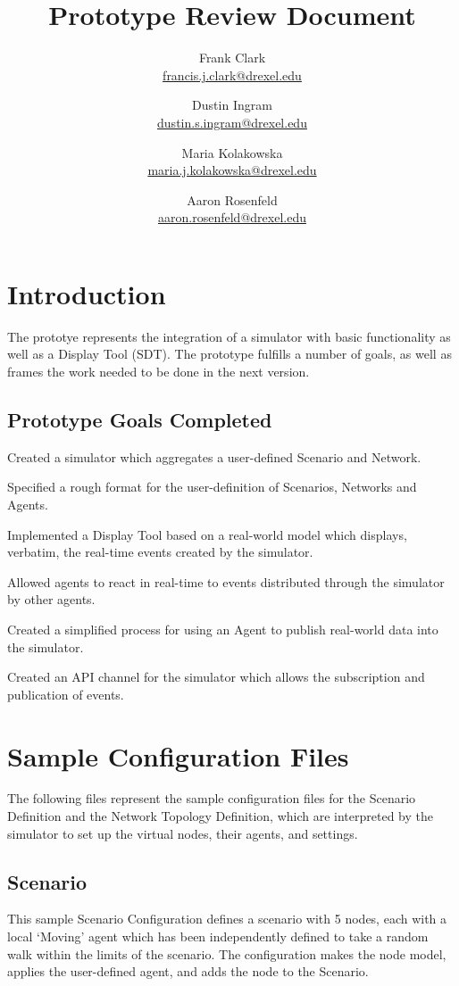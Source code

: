 \documentclass{article}
\title{Prototype Review Document}
\author{
	Frank Clark \\\url{francis.j.clark@drexel.edu}
    \and Dustin Ingram \\\url{dustin.s.ingram@drexel.edu}
	\and Maria Kolakowska \\\url{maria.j.kolakowska@drexel.edu}
    \and Aaron Rosenfeld \\\url{aaron.rosenfeld@drexel.edu}
}
\begin{document}
\maketitle

\section{Introduction}
The prototye represents the integration of a simulator with basic functionality as well as a Display Tool (SDT). The prototype fulfills a number of goals, as well as frames the work needed to be done in the next version.
\subsection{Prototype Goals Completed}
\begin{itemized}
    \item Created a simulator which aggregates a user-defined Scenario and Network.
    \item Specified a rough format for the user-definition of Scenarios, Networks and Agents.
    \item Implemented a Display Tool based on a real-world model which displays, verbatim, the real-time events created by the simulator.
    \item Allowed agents to react in real-time to events distributed through the simulator by other agents.
    \item Created a simplified process for using an Agent to publish real-world data into the simulator.
    \item Created an API channel for the simulator which allows the subscription and publication of events.
\end{itemized}
\section{Sample Configuration Files}
The following files represent the sample configuration files for the Scenario Definition and the Network Topology Definition, which are interpreted by the simulator to set up the virtual nodes, their agents, and settings.
\subsection{Scenario}
This sample Scenario Configuration defines a scenario with 5 nodes, each with a local `Moving' agent which has been independently defined to take a random walk within the limits of the scenario. The configuration makes the node model, applies the user-defined agent, and adds the node to the Scenario. 
\end{document}
